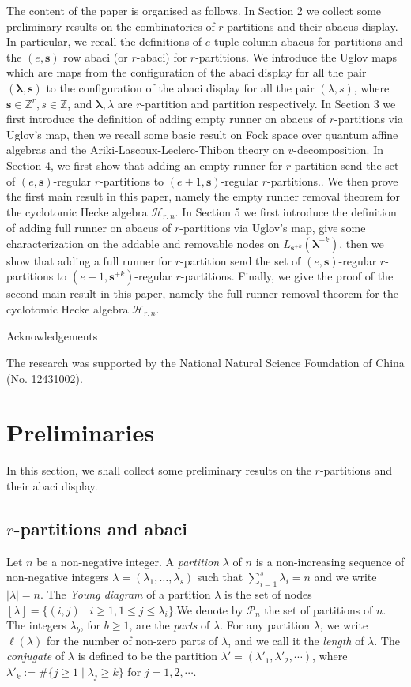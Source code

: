 \documentclass[a4paper,10pt]{amsart}
\theoremstyle{plain}
\renewcommand{\H}{\mathcal{H}}
\newcommand{\lam}{\lambda}
\def\bs{{\boldsymbol{s}}}
\def\Z{{\mathbb Z}}
\def\blam{{\boldsymbol \lambda}}
\theoremstyle{plain}
\numberwithin{equation}{section}
\begin{document}
The content of the paper is organised as follows. In Section 2 we collect some preliminary results on the combinatorics of $r$-partitions and their abacus display. In particular, we recall the definitions of $e$-tuple column abacus for partitions and the $(e,\bs)$ row abaci (or $r$-abaci) for $r$-partitions. We introduce the Uglov maps which are maps from the configuration of the abaci display for all the pair $(\blam,\bs)$ to the configuration of the abaci display for all the pair $(\lam,s)$, where $\bs\in\Z^r, s\in\Z$, and $\blam, \lam$ are $r$-partition and partition respectively. In Section 3 we first introduce the definition of adding empty runner on abacus of $r$-partitions via Uglov's map, then we recall some basic result on Fock space over quantum affine algebras and the Ariki-Lascoux-Leclerc-Thibon theory on $v$-decomposition. In Section 4, we first show that adding an empty runner for $r$-partition send the set of $(e,\bs)$-regular $r$-partitions to $(e+1,\bs)$-regular $r$-partitions.. We then prove the first main result in this paper, namely the empty runner removal theorem for the cyclotomic Hecke algebra \(\H_{r,n}\). In Section 5 we first introduce the definition of adding full runner on abacus of $r$-partitions via Uglov's map, give some characterization on the addable and removable nodes on $L_{\bs^{+k}}(\blam^{+k})$, then we show that adding a full runner for $r$-partition send the set of $(e,\bs)$-regular $r$-partitions to $(e+1,\bs^{+k})$-regular $r$-partitions. Finally, we give the proof of the second main result in this paper, namely the full runner removal theorem for the cyclotomic Hecke algebra \(\H_{r,n}\).



\bigskip
\centerline{Acknowledgements}
\smallskip

The research was supported by the National Natural Science Foundation of China (No. 12431002).
\bigskip


\section{Preliminaries}
In this section, we shall collect some preliminary results on the $r$-partitions and their abaci display.

\subsection{$r$-partitions and abaci}

Let $n$ be a non-negative integer. A {\em partition} $\lam$ of $n$ is a non-increasing sequence of non-negative integers $\lam=(\lam_1,\dots,\lam_s)$ such that $\sum_{i=1}^{s}\lam_i=n$ and we write $|\lam|=n$.
The {\em Young diagram} of a partition $\lam$ is the set of nodes $[\lam]=\{(i,j)\mid i\geq 1, 1\leq j\leq\lam_{i}\}$.We denote by $\mathcal{P}_n$ the set of partitions  of $n$. The integers $\lambda_b$, for $b\ge 1$, are the \textit{parts} of $\lambda$. For any partition $\lambda$, we write $\ell(\lambda)$ for the number of non-zero parts of $\lambda$, and we call it the \textit{length} of $\lambda$.
The {\em conjugate} of $\lam$ is defined to be the partition $\lam'=(\lam'_1,\lam'_2,\cdots)$, where $\lam'_k:=\#\{j\geq 1\mid\lam_j\geq k\}$ for $j=1,2,\cdots$.
\end{document}
